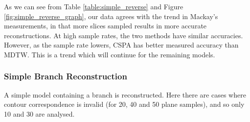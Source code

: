 \documentclass[11p, titlepage]{article}
\begin{document}
As we can see from Table \ref{table:simple_reverse} and Figure \ref{fig:simple_reverse_graph}, our data agrees with the trend in Mackay's measurements, in that more slices sampled results in more accurate reconstructions. At high sample rates, the two methods have similar accuracies. However, as the sample rate lowers, CSPA has better measured accuracy than MDTW. This is a trend which will continue for the remaining models.

\subsubsection{Simple Branch Reconstruction}

A simple model containing a branch is reconstructed. Here there are cases where contour correspondence is invalid (for 20, 40 and 50 plane samples), and so only 10 and 30 are analysed.
\end{document}
